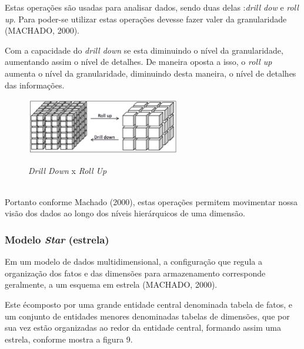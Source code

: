 Estas opera\c{c}\~{o}es s\~{a}o usadas para analisar dados, sendo duas delas
:\textit{drill dow} e \textit{roll up}. Para poder-se utilizar estas opera\c{c}\~{o}es devesse fazer valer da granularidade (MACHADO, 2000).

Com a capacidade do \textit{drill down} se esta diminuindo o n\'{i}vel da granularidade, aumentando assim o n\'{i}vel de detalhes. De maneira oposta a isso, 
o \textit{roll up} aumenta o n\'{i}vel da granularidade, diminuindo desta maneira, o n\'{i}vel de detalhes das informa\c{c}\~{o}es.

\begin{figure}[H]
	\vspace*{0,2cm}
    \centering
    \caption{\textit{Drill Down} x  \textit{Roll Up}}
    \includegraphics[width=0.6\textwidth]{./04-figuras/figura-08}
    \label{fig:ilustfig08}
\end{figure}
\vspace*{-0,9cm}
{\raggedright {}}\\

Portanto conforme Machado (2000), estas opera\c{c}\~{o}es permitem movimentar nossa vis\~{a}o dos dados ao longo dos n\'{i}veis hier\'{a}rquicos de uma dimens\~{a}o.

\subsubsection{Modelo \textit{Star} (estrela)}

Em um modelo de dados multidimensional, a configura\c{c}\~{a}o que regula a organiza\c{c}\~{a}o dos fatos e das dimens\~{o}es para armazenamento corresponde geralmente, a um esquema em estrela (MACHADO, 2000).

Este \'{e}composto por uma grande entidade central denominada tabela de fatos, e um conjunto de entidades menores denominadas tabelas de dimens\~{o}es, que por sua vez est\~{a}o organizadas ao redor da entidade central, formando assim uma estrela, conforme mostra a figura 9.

